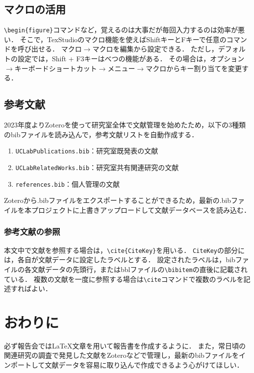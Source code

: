\documentclass[uplatex]{jsarticle}
\begin{document}
\subsection{マクロの活用}

\verb|\begin{figure}|コマンドなど，覚えるのは大事だが毎回入力するのは効率が悪い．
そこで，TexStudioのマクロ機能を使えばShiftキーとFキーで任意のコマンドを呼び出せる．
マクロ$\to$マクロを編集から設定できる．
ただし，デフォルトの設定では，Shift + F3キーはべつの機能がある．
その場合は，オプション$\to$キーボードショートカット$\to$メニュー$\to$マクロからキー割り当てを変更する．


\subsection{参考文献}

2023年度よりZoteroを使って研究室全体で文献管理を始めたため，以下の3種類のbibファイルを読み込んで，参考文献リストを自動作成する．
\begin{enumerate}
    \item \texttt{UCLabPublications.bib}：研究室既発表の文献
    \item \texttt{UCLabRelatedWorks.bib}：研究室共有関連研究の文献
    \item \texttt{references.bib}：個人管理の文献
\end{enumerate}

Zoteroから.bibファイルをエクスポートすることができるため，最新の.bibファイルを本プロジェクトに上書きアップロードして文献データベースを読み込む．

\subsubsection{参考文献の参照}
本文中で文献を参照する場合は，\verb|\cite{CiteKey}|を用いる\cite{Suzuki-2013sep}．
\texttt{CiteKey}の部分には，各自が文献データに設定したラベルとする．
設定されたラベルは，bibファイルの各文献データの先頭行，またはbblファイルの\verb|\bibitem|の直後に記載されている．
複数の文献を一度に参照する場合は\verb|\cite|コマンドで複数のラベルを記述すればよい\cite{Hayashi-2019jan,Tanaka-2021jan}．


\section{おわりに}
必ず報告会では\LaTeX 文章を用いて報告書を作成するように．
また，常日頃の関連研究の調査で発見した文献をZoteroなどで管理し，最新のbibファイルをインポートして文献データを容易に取り込んで作成できるよう心がけてほしい．
\end{document}

